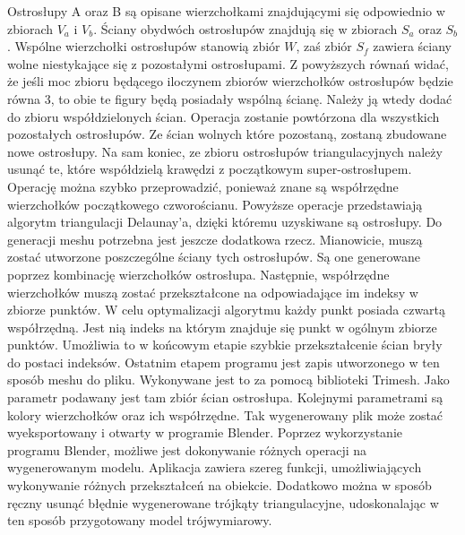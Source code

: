 Ostrosłupy A oraz B są opisane wierzchołkami znajdującymi się odpowiednio w zbiorach $V_{a}$ i $V_{b}$. Ściany obydwóch ostrosłupów znajdują się w zbiorach $S_{a}$ oraz $S_{b}$. Wspólne wierzchołki ostrosłupów stanowią zbiór $W$, zaś zbiór $S_{f}$ zawiera ściany wolne niestykające się z pozostałymi ostrosłupami.
\newline \indent Z powyższych równań widać, że jeśli moc zbioru będącego iloczynem zbiorów wierzchołków ostrosłupów będzie równa 3, to obie te figury będą posiadały wspólną ścianę. Należy ją wtedy dodać do zbioru współdzielonych ścian. Operacja zostanie powtórzona dla wszystkich pozostałych ostrosłupów. Ze ścian wolnych które pozostaną, zostaną zbudowane nowe ostrosłupy.
\newline \indent Na sam koniec, ze zbioru ostrosłupów triangulacyjnych należy usunąć te, które współdzielą krawędzi z początkowym super-ostrosłupem. Operację można szybko przeprowadzić, ponieważ znane są współrzędne wierzchołków początkowego czworościanu. 
\newline \indent Powyższe operacje przedstawiają algorytm triangulacji Delaunay'a, dzięki któremu uzyskiwane są ostrosłupy. Do generacji meshu potrzebna jest jeszcze dodatkowa rzecz. Mianowicie, muszą zostać utworzone poszczególne ściany tych ostrosłupów. Są one generowane poprzez kombinację wierzchołków ostrosłupa. Następnie, współrzędne wierzchołków muszą zostać przekształcone na odpowiadające im indeksy w zbiorze punktów. W celu optymalizacji algorytmu każdy punkt posiada czwartą współrzędną. Jest nią indeks na którym znajduje się punkt w ogólnym zbiorze punktów. Umożliwia to w końcowym etapie szybkie przekształcenie ścian bryły do postaci indeksów.
\newline \indent Ostatnim etapem programu jest zapis utworzonego w ten sposób meshu do pliku. Wykonywane jest to za pomocą biblioteki Trimesh. Jako parametr podawany jest tam zbiór ścian ostrosłupa. Kolejnymi parametrami są kolory wierzchołków oraz ich współrzędne. Tak wygenerowany plik może zostać wyeksportowany i otwarty w programie Blender. Poprzez wykorzystanie programu Blender, możliwe jest dokonywanie różnych operacji na wygenerowanym modelu. Aplikacja zawiera szereg funkcji, umożliwiających wykonywanie różnych przekształceń na obiekcie. Dodatkowo można w sposób ręczny usunąć błędnie wygenerowane trójkąty triangulacyjne, udoskonalając w ten sposób przygotowany model trójwymiarowy.
